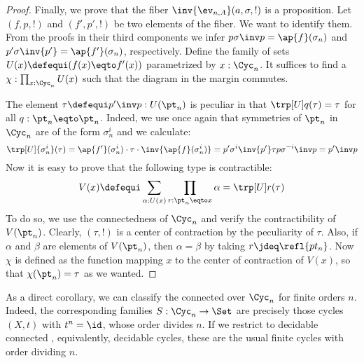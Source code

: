 \begin{proof}
  Finally, we prove that the fiber $\inv{\ev_{n,A}}(a,\sigma,!)$ is a
  proposition. Let $(f,p,!)$ and $(f',p',!)$
  be two elements of the fiber. We want to identify them.
  From the proofs in their third
  components we infer $p\sigma\inv p = \ap{f}(\sigma_n)$ and
  $p'\sigma\inv {p'} = \ap{f'}(\sigma_n)$, respectively.
  Define the family of sets $U(x)\defequi (f(x) \eqto f'(x))$
  parametrized by $x:\Cyc_n$.
  It suffices to find a $\chi:\prod_{x:\Cyc_n} U(x)$
  such that the diagram in the margin commutes.
  \begin{marginfigure}
  \end{marginfigure}
  The element $\tau\defequi p'\inv p : U(\pt_n)$ is peculiar in that
  $\trp[U] q (\tau) = \tau$ for all $q:\pt_n\eqto\pt_n$.
  Indeed, we use once again that symmetries of $\pt_n$ in $\Cyc_n$ are
  of the form $\sigma_n^i$ and we calculate:
  \begin{displaymath}
    \trp[U] {\sigma_n^i} (\tau) =
    \ap {f'} (\sigma_n^i) \cdot \tau \cdot \inv{\ap {f}(\sigma_n^i)}
    = p' \sigma^i \inv {p'} \tau p \sigma^{-i} \inv p = p' \inv p
  \end{displaymath}
  Now it is easy to prove that the following type is contractible:
  \begin{displaymath}
    V(x) \defequi \sum_{\alpha: U(x)} \prod_{r:\pt_n\eqto x}
    \alpha = \trp[U] r (\tau)
  \end{displaymath}
  To do so, we use the connectedness of $\Cyc_n$ and verify the contractibility
  of $V(\pt_n)$. Clearly, $(\tau,!)$ is a center of contraction
  by the peculiarity of $\tau$. Also, if $\alpha$ and $\beta$ are
  elements of $V(\pt_n)$, then $\alpha=\beta$ by taking $r\jdeq\refl{pt_n}$.
  Now $\chi$ is defined as the function mapping $x$ to
  the center of contraction of $V(x)$, so that $\chi(\pt_n) = \tau$ as we wanted.
\end{proof}

As a direct corollary, we can classify the connected \coverings over $\Cyc_n$ for finite orders $n$.
Indeed, the corresponding families $S : \Cyc_n \to \Set$ are precisely those cycles $(X,t)$
with $t^n=\id$, \ie whose order divides $n$.
If we restrict to decidable connected \coverings, equivalently, decidable cycles,
these are the usual finite cycles with order dividing $n$.

